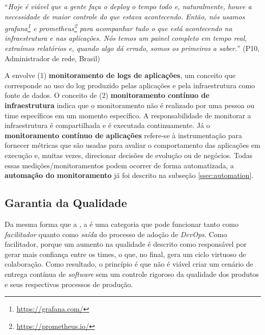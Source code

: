 \begin{mq}
``\emph{Hoje é viável que a gente faça o deploy o tempo todo e, naturalmente,
houve a necessidade de maior controle do que estava acontecendo. Então, nós
usamos grafana\footnote{\url{https://grafana.com/}} e prometheus\footnote{\url{https://prometheus.io/}}
para acompanhar tudo o que está acontecendo na infraestrutura e nas aplicações.
Nós temos um painel completo em tempo real, extraímos relatórios e, quando algo
dá errado, somos os primeiros a saber.}''
(P10, Administrador de rede, Brasil)
\end{mq}

A  envolve (1) {\bf monitoramento de logs de aplicações},
um conceito que corresponde ao uso do log produzido pelas aplicações e pela
infraestrutura como fonte de dados. O conceito de (2) {\bf monitoramento
contínuo de infraestrutura} indica que o monitoramento não é realizado por uma
pessoa ou time específicos em um momento específico. A responsabilidade de
monitorar a infraestrutura é compartilhada e é executada continuamente.
Já o {\bf monitoramento contínuo de aplicações} refere-se à instrumentação para
fornecer métricas que são usadas para avaliar o comportamento das aplicações em
execução e, muitas vezes, direcionar decisões de evolução ou de negócios. Todas
essas medições/monitoramentos podem ocorrer de forma automatizada,
a {\bf automação do monitoramento} já foi descrito na subseção \ref{ssec:automation}.


\subsection{Garantia da Qualidade}

Da mesma forma que a , a  é
uma categoria que pode funcionar tanto como \emph{facilitador} quanto como \emph{saída}
do processo de adoção de {\it DevOps}. Como facilitador, porque um aumento na
qualidade é descrito como responsável por gerar mais confiança entre os times,
o que, no final, gera um ciclo virtuoso de colaboração. Como resultado, o
princípio é que não é viável criar um cenário de entrega contínua de {\it software}
sem um controle rigoroso da qualidade dos produtos e seus respectivos processos
de produção.

